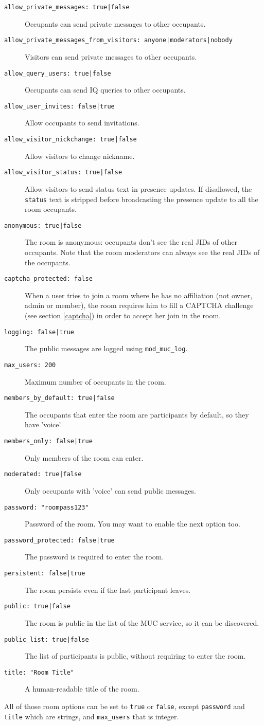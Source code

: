 \documentclass[a4paper,10pt]{book}
\newcommand{\bracehack}{\def\{{\char"7B}\def\}{\char"7D}}
\newcommand{\titem}[1]{\item[\bracehack\texttt{#1}]}
\newcommand{\term}[1]{\texttt{#1}}
\begin{document}
\begin{description}
\begin{description}
  \titem{allow\_private\_messages: true|false} Occupants can send private messages to other occupants.
  \titem{allow\_private\_messages\_from\_visitors: anyone|moderators|nobody} Visitors can send private messages to other occupants.
  \titem{allow\_query\_users: true|false} Occupants can send IQ queries to other occupants.
  \titem{allow\_user\_invites: false|true} Allow occupants to send invitations.
  \titem{allow\_visitor\_nickchange: true|false} Allow visitors to
  change nickname.
  \titem{allow\_visitor\_status: true|false} Allow visitors to send
  status text in presence updates.  If disallowed, the \term{status}
  text is stripped before broadcasting the presence update to all
  the room occupants.
  \titem{anonymous: true|false} The room is anonymous:
  occupants don't see the real JIDs of other occupants.
  Note that the room moderators can always see the real JIDs of the occupants.
  \titem{captcha\_protected: false} 
  When a user tries to join a room where he has no affiliation (not owner, admin or member),
  the room requires him to fill a CAPTCHA challenge (see section \ref{captcha})
  in order to accept her join in the room.
  \titem{logging: false|true} The public messages are logged using \term{mod\_muc\_log}.
  \titem{max\_users: 200} Maximum number of occupants in the room.
  \titem{members\_by\_default: true|false} The occupants that enter the room are participants by default, so they have 'voice'.
  \titem{members\_only: false|true} Only members of the room can enter.
  \titem{moderated: true|false} Only occupants with 'voice' can send public messages.
  \titem{password: "roompass123"} Password of the room. You may want to enable the next option too.
  \titem{password\_protected: false|true} The password is required to enter the room.
  \titem{persistent: false|true} The room persists even if the last participant leaves.
  \titem{public: true|false} The room is public in the list of the MUC service, so it can be discovered.
  \titem{public\_list: true|false} The list of participants is public, without requiring to enter the room.
  \titem{title: "Room Title"} A human-readable title of the room.
  \end{description}
  All of those room options can be set to \term{true} or \term{false},
  except \term{password} and \term{title} which are strings,
  and \term{max\_users} that is integer.
\end{description}
\end{document}
